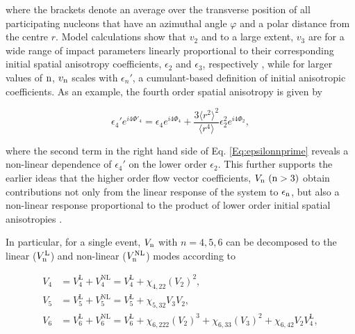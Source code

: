 where the brackets denote an average over the transverse position of all participating nucleons that have an azimuthal angle $\varphi$ and a polar distance from the centre $r$. Model calculations show that $v_2$ and to a large extent, $v_3$ are for a wide range of impact parameters linearly proportional to their corresponding initial spatial anisotropy coefficients, $\epsilon_{2}$ and $\epsilon_{3}$, respectively \cite{Alver:2010gr}, while for larger values of $\rm n$, $v_{\rm n}$ scales with $\epsilon_{n}'$, a cumulant-based definition of initial anisotropic coefficients.  
As an example, the fourth order spatial anisotropy is given by \cite{Teaney:2013dta,Qian:2017ier}
 
\begin{equation}
\epsilon_{4}'e^{i4\Phi'_4} = \epsilon_{4}e^{i4\Phi_4}  + \frac{3\langle{r^{2}}\rangle^{2}}{\langle r^4\rangle}\epsilon_{2}^{2}e^{i4\Phi_2},
\label{Eq:epsilonnprime}
\end{equation}

where the second term in the right hand side of Eq. \ref{Eq:epsilonnprime} reveals a non-linear dependence of $\epsilon_{4}'$ on the lower order $\epsilon_{2}$. This further supports the earlier ideas that the higher order flow vector coefficients, $V_{\rm n}~({\rm n} > 3)$ obtain contributions not only from the linear response of the system to $\epsilon_{\rm n}$, but also a non-linear response proportional to the product of lower order initial spatial anisotropies \cite{Bhalerao:2014xra,Yan:2015jma}. 

In particular, for a single event, $V_{\rm n}$ with $n=4,5,6$ can be decomposed to the linear ($V_{\rm n}^{\mathrm{L}} $) and non-linear ($ V_{\rm n}^{\mathrm{NL}}$) modes according to

\vspace{-0.55cm}
\begin{align}
V_{4} &= V_{4}^{\mathrm{L}} + V_{4}^{\mathrm{NL}} = V_{4}^{\mathrm{L}} + \chi_{4,22}(V_{2})^2, \nonumber \\
V_{5} &= V_{5}^{\mathrm{L}} + V_{5}^{\mathrm{NL}} = V_{5}^{\mathrm{L}} + \chi_{5,32}V_{3}V_{2}, \nonumber \\
V_{6} &= V_{6}^{\mathrm{L}} + V_{6}^{\mathrm{NL}} = V_{6}^{\mathrm{L}} + \chi_{6,222}(V_{2})^3 + \chi_{6,33}(V_{3})^2 + \chi_{6,42}V_{2}V_{4}^{\mathrm{L}},
\label{Eq:V4V5V6}
\end{align}
\vspace{-0.55cm}

